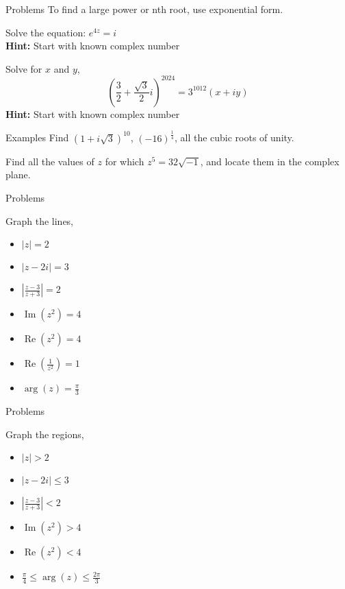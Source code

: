 \documentclass[11pt]{beamer}
\theoremstyle{plain}
\begin{document}
\begin{frame}{Problems}
To find a large power or nth root, use exponential form. 
    \begin{problem}
        Solve the equation: $e^{4z}=i$\\
        \textbf{Hint:} Start with known complex number
    \end{problem}
    \begin{problem}
        Solve for $x$ and $y$,
        $$
        \left(\frac{3}{2}+\frac{\sqrt 3}{2}i\right)^{2024}=3^{1012}(x+iy)
        $$
        \textbf{Hint:} Start with known complex number
    \end{problem}
\end{frame}
\begin{frame}{Examples}
    Find $(1+i\sqrt 3)^{10}$, $(-16)^{\frac14}$, all the cubic roots of unity.
    \begin{problem}
        Find all the values of $z$ for which $z^5=32\sqrt{-1}$, and locate them in the complex plane.
    \end{problem}
\end{frame}
\begin{frame}{Problems}
    \begin{problem}
        Graph the lines,
        \begin{itemize}
            \item $|z|=2$
            \item $|z-2i|=3$
            \item $\left|\frac{z-3}{z+3} \right|=2$
            \item $\operatorname{Im}(z^2)=4$
            \item $\operatorname{Re}(z^2)=4$
            \item $\operatorname{Re}\left(\frac{1}{z^2}\right)=1$
            \item $\arg(z)=\frac{\pi}{3}$
        \end{itemize}
    \end{problem}
\end{frame}
\begin{frame}{Problems}
    \begin{problem}
        Graph the regions,
        \begin{itemize}
            \item $|z|>2$
            \item $|z-2i|\leq 3$
            \item $\left|\frac{z-3}{z+3} \right|<2$
            \item $\operatorname{Im}(z^2)>4$
            \item $\operatorname{Re}(z^2)<4$
            \item $\frac{\pi}4\leq\arg(z)\leq\frac{2\pi}{3}$
        \end{itemize}
    \end{problem}
\end{frame}
\end{document}
